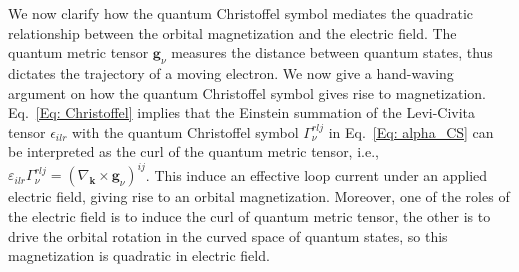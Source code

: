 \documentclass[aps,prl,twocolumn,amsmath,amssymb,showpacs, superscriptaddress,notitlepage,longbibliography,10pt]{revtex4-1}
\begin{document}
We now clarify how the quantum Christoffel symbol mediates the quadratic relationship between the orbital magnetization and the electric field. The quantum metric tensor $ \mathbf{g}_\nu$ measures the distance between quantum states, thus dictates the trajectory of a moving electron. We now give a hand-waving argument on how the quantum Christoffel symbol gives rise to magnetization. Eq.~\eqref{Eq: Christoffel} implies that the Einstein summation of the Levi-Civita tensor $\epsilon_{ilr}$ with the quantum Christoffel symbol $\Gamma_\nu^{rlj}$ in Eq.~\eqref{Eq: alpha_CS} can be interpreted as the curl of the quantum metric tensor, i.e., $\varepsilon_{ilr}\Gamma_\nu^{rlj} = (\nabla_\mathbf{k} \times \mathbf{g}_\nu)^{ij}$. This induce an effective loop current under an applied electric field, giving rise to an orbital magnetization. Moreover, one of the roles of the electric field is to induce the curl of quantum metric tensor, the other is to drive the orbital rotation in the curved space of quantum states, so this magnetization is quadratic in electric field.
\end{document}
